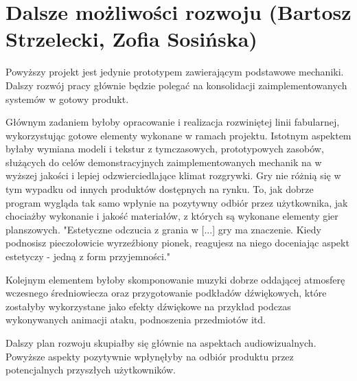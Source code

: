 \section{Dalsze możliwości rozwoju (Bartosz Strzelecki, Zofia Sosińska)}\label{s:dalsze}
Powyższy projekt jest jedynie prototypem zawierającym podstawowe mechaniki.
Dalszy rozwój pracy głównie będzie polegać na konsolidacji zaimplementowanych
systemów w gotowy produkt.

Głównym zadaniem byłoby opracowanie i realizacja rozwiniętej linii fabularnej,
wykorzystując gotowe elementy wykonane w ramach projektu. Istotnym aspektem
byłaby wymiana  modeli i tekstur z tymczasowych, prototypowych zasobów, służących
do celów demonstracyjnych zaimplementowanych mechanik na w wyższej jakości
i lepiej odzwierciedlające klimat rozgrywki. Gry nie różnią się w tym wypadku od
innych produktów dostępnych na rynku. To, jak dobrze program wygląda tak samo wpłynie na
pozytywny odbiór przez użytkownika, jak chociażby wykonanie i jakość materiałów, z których są wykonane elementy
gier planszowych. "Estetyczne odczucia z grania w [...] gry ma znaczenie. Kiedy podnosisz pieczołowicie wyrzeźbiony pionek, reagujesz na niego
doceniając aspekt estetyczy - jedną z form przyjemności."\cite{theory_of_fun}

Kolejnym elementem byłoby skomponowanie muzyki dobrze oddającej atmosferę wczesnego
średniowiecza oraz przygotowanie podkładów dźwiękowych, które zostałyby wykorzystane
jako efekty dźwiękowe na przykład podczas wykonywanych animacji ataku, podnoszenia przedmiotów itd.

Dalszy plan rozwoju skupiałby się głównie na aspektach audiowizualnych.
Powyższe aspekty pozytywnie wpłynęłyby na odbiór produktu przez potencjalnych przyszłych
użytkowników. 
